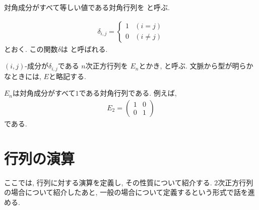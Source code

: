 \begin{definition}
  \label{def:mat:scalar}
  対角成分がすべて等しい値である対角行列を
  と呼ぶ.
\end{definition}


\begin{definition}
  \label{def:ksdelta}
  \begin{align*}
    \delta_{i,j}=
    \begin{cases}
      1&(i=j)\\
      0&(i\neq j)
    \end{cases}
  \end{align*}
  とおく.  この関数$\delta$は
  と呼ばれる.
\end{definition}

\begin{definition}
  \label{def:mat:unit}
  $(i,j)$-成分が$\delta_{i,j}$である
  $n$次正方行列を
  $E_{n}$とかき,
  と呼ぶ.
  文脈から型が明らかなときには,
  $E$と略記する.
\end{definition}

\begin{example}
  $E_n$は対角成分がすべて$1$である対角行列である.
  例えば,
  \begin{align*}
    E_2=
    \begin{pmatrix}
      1&0\\
      0&1
    \end{pmatrix}
  \end{align*}
  である.
\end{example}

\section{行列の演算}
ここでは,
行列に対する演算を定義し, その性質について紹介する.
$2$次正方行列の場合について紹介したあと,
一般の場合について定義するという形式で話を進める.


